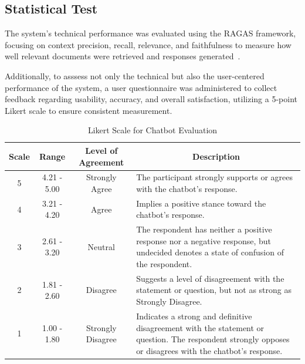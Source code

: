 \begin{refsection}
\subsection{Statistical Test}

The system’s technical performance was evaluated using the RAGAS framework, focusing on context precision, recall, relevance, and faithfulness to measure how well relevant documents were retrieved and responses generated~\cite{holmes2023chatbot, ameli2024ranking, lin2024satisfaction}.

Additionally, to asssess not only the technical but also the user-centered performance of the system, a user questionnaire was administered to collect feedback regarding usability, accuracy, and overall satisfaction, utilizing a 5-point Likert scale to ensure consistent measurement.

\begin{table}[H]
    \centering
    \caption{Likert Scale for Chatbot Evaluation}
    \label{tab:likert_scale}
    \begin{tabular}{cccm{7cm}}
        \hline
        \textbf{Scale} & \textbf{Range} & \textbf{Level of Agreement} & \multicolumn{1}{c}{\textbf{Description}} \\
        \hline
                5 & 4.21 - 5.00 & Strongly Agree & The participant strongly supports or agrees with the chatbot's response.\\
        \hline
                4 & 3.21 - 4.20 & Agree & Implies a positive stance toward the chatbot's response. \\
        \hline
                3 & 2.61 - 3.20 & Neutral & The respondent has neither a positive response nor a negative response, but undecided denotes a state of confusion of the respondent. \\
        \hline
                2 & 1.81 - 2.60 & Disagree & Suggests a level of disagreement with the statement or question, but not as strong as Strongly Disagree.\\
        \hline
                1 & 1.00 - 1.80 & Strongly Disagree & Indicates a strong and definitive disagreement with the statement or question. The respondent strongly opposes or disagrees with the chatbot's response.\\
        \hline
    \end{tabular}
\end{table}


\end{refsection}
